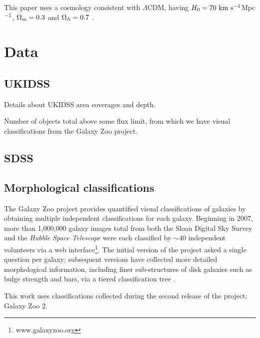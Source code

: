 \documentclass[useAMS,usenatbib]{mn2e}
\begin{document}
This paper uses a cosmology consistent with $\Lambda$CDM, having $H_{\rm 0}=70~{\rm
km~s^{-1}}$Mpc$^{\rm -1}$, $\Omega_{\rm m}=0.3$ and $\Omega_{\rm \Lambda}=0.7$ \citep{ben13,pla13}.




%
%
\section{Data}\label{sec:data}
%
%

\subsection{UKIDSS}\label{sec:ukidss_data}

Details about UKIDSS area coverages and depth.

Number of objects total above some flux limit, from which we have visual classifications from the Galaxy Zoo project.


\subsection{SDSS}\label{sec:sdss_data}


\subsection{Morphological classifications}\label{sec:gz_data}

The Galaxy Zoo project provides quantified visual classifications of galaxies by obtaining multiple independent classifications for each galaxy. Beginning in 2007, more than 1,000,000 galaxy images total from both the Sloan Digital Sky Survey and the \emph{Hubble Space Telescope} were each classified by $\sim 40$ independent volunteers via a web interface\footnote{www.galaxyzoo.org}. The initial version of the project \citep{lin08,lin11} asked a single question per galaxy; subsequent versions have collected more detailed morphological information, including finer sub-structures of disk galaxies such as bulge strength and bars, via a tiered classification tree \citep[e.g.,][]{wil13}. 

This work uses classifications collected during the second release of the project: Galaxy Zoo 2. %
\end{document}
